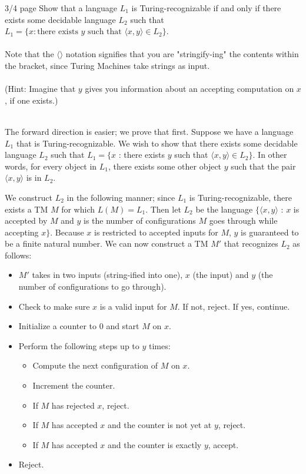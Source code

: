 \documentclass[solution, letterpaper]{cs121}
\begin{document}
 {3/4 page}
Show that a language $L_1$ is Turing-recognizable if and only if there exists some decidable language $L_2$ such that $L_1 = \{x : \text{there exists $y$ such that $\langle x,y \rangle \in L_2$}\}$. \\ \\
Note that the $\langle \rangle$ notation signifies that you are "stringify-ing" the contents within the bracket, since Turing Machines take strings as input. \\ \\ 
(Hint: Imagine that $y$ gives you information about an accepting computation on $x$, if one exists.) \\ \\
\begin{solution}
The forward direction is easier; we prove that first.  Suppose we have a language $L_1$ that is Turing-recognizable.  We wish to show that there exists some decidable language $L_2$ such that $L_1 = \{x$ : there exists $y$ such that $\langle x,y \rangle \in L_2\}$.  In other words, for every object in $L_1$, there exists some other object $y$ such that the pair $\langle x,y\rangle$ is in $L_2$.

We construct $L_2$ in the following manner; since $L_1$ is Turing-recognizable, there exists a TM $M$ for which $L(M) = L_1$.  Then let $L_2$ be the language $\{\langle x,y\rangle$ : $x$ is accepted by $M$ and $y$ is the number of configurations $M$ goes through while accepting $x\}$.  Because $x$ is restricted to accepted inputs for $M$, $y$ is guaranteed to be a finite natural number.  We can now construct a TM $M'$ that recognizes $L_2$ as follows:
\begin{itemize}
	\setlength\itemsep{0cm}
	\item $M'$ takes in two inputs (string-ified into one), $x$ (the input) and $y$ (the number of configurations to go through).
	\item Check to make sure $x$ is a valid input for $M$.  If not, reject.  If yes, continue.
	\item Initialize a counter to 0 and start $M$ on $x$.
	\item Perform the following steps up to $y$ times:
	\begin{itemize}
		\item Compute the next configuration of $M$ on $x$.
		\item Increment the counter.
		\item If $M$ has rejected $x$, reject.
		\item If $M$ has accepted $x$ and the counter is not yet at $y$, reject.
		\item If $M$ has accepted $x$ and the counter is exactly $y$, accept.
	\end{itemize}
	\item Reject.
\end{itemize}


\end{solution}
\end{document}
